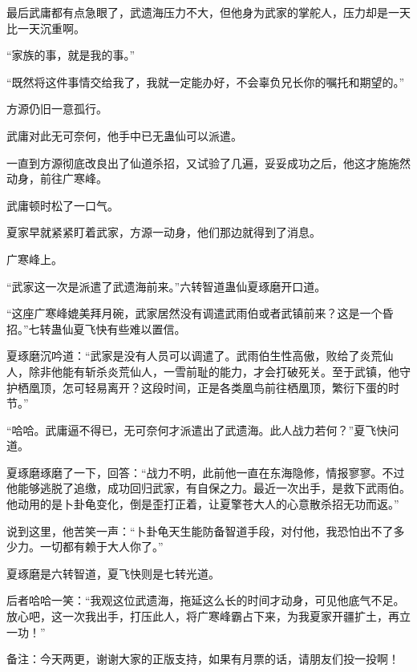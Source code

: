 \begin{this_body}
最后武庸都有点急眼了，武遗海压力不大，但他身为武家的掌舵人，压力却是一天比一天沉重啊。

“家族的事，就是我的事。”

“既然将这件事情交给我了，我就一定能办好，不会辜负兄长你的嘱托和期望的。”

方源仍旧一意孤行。

武庸对此无可奈何，他手中已无蛊仙可以派遣。

一直到方源彻底改良出了仙道杀招，又试验了几遍，妥妥成功之后，他这才施施然动身，前往广寒峰。

武庸顿时松了一口气。

夏家早就紧紧盯着武家，方源一动身，他们那边就得到了消息。

广寒峰上。

“武家这一次是派遣了武遗海前来。”六转智道蛊仙夏琢磨开口道。

“这座广寒峰媲美拜月碗，武家居然没有调遣武雨伯或者武镇前来？这是一个昏招。”七转蛊仙夏飞快有些难以置信。

夏琢磨沉吟道：“武家是没有人员可以调遣了。武雨伯生性高傲，败给了炎荒仙人，除非他能有斩杀炎荒仙人，一雪前耻的能力，才会打破死关。至于武镇，他守护栖凰顶，怎可轻易离开？这段时间，正是各类凰鸟前往栖凰顶，繁衍下蛋的时节。”

“哈哈。武庸逼不得已，无可奈何才派遣出了武遗海。此人战力若何？”夏飞快问道。

夏琢磨琢磨了一下，回答：“战力不明，此前他一直在东海隐修，情报寥寥。不过他能够逃脱了追缴，成功回归武家，有自保之力。最近一次出手，是救下武雨伯。他动用的是卜卦龟变化，倒是歪打正着，让夏擎苍大人的心意散杀招无功而返。”

说到这里，他苦笑一声：“卜卦龟天生能防备智道手段，对付他，我恐怕出不了多少力。一切都有赖于大人你了。”

夏琢磨是六转智道，夏飞快则是七转光道。

后者哈哈一笑：“我观这位武遗海，拖延这么长的时间才动身，可见他底气不足。放心吧，这一次我出手，打压此人，将广寒峰霸占下来，为我夏家开疆扩土，再立一功！”

备注：今天两更，谢谢大家的正版支持，如果有月票的话，请朋友们投一投啊！

\end{this_body}

